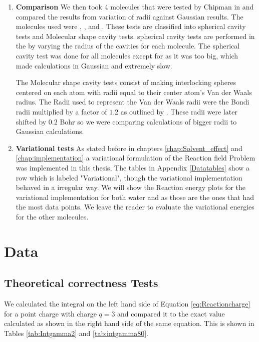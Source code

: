 \documentclass[../master_thesis.tex]{subfiles}
\begin{document}
\begin{enumerate}
\item \textbf{Comparison} We then took 4 molecules that were tested by Chipman in \cite{Chipman2002} and compared the
results from variation of radii against Gaussian results. The molecules used
were , ,  and . These tests are classified into
spherical cavity tests and Molecular shape cavity tests. spherical cavity tests are performed in the
by varying the radius of the cavities for each molecule. The spherical cavity test was done for
all molecules except for  as it was too big, which made calculations
in Gaussian and \mrchem extremely slow.

The Molecular shape cavity tests consist of making interlocking spheres centered on
each atom with radii equal to their center atom's Van der Waals radius. The Radii
used to represent the Van der Waals radii were the Bondi radii multiplied by a factor of
$1.2$ as outlined by \cite{Tomasi:1994wt}. These radii were later shifted by $0.2$ Bohr
so we were comparing \mrchem calculations of bigger radii to Gaussian calculations.

\item \textbf{Variational tests} As stated before in chapters \ref{chap:Solvent_effect} and \ref{chap:implementation}
a variational formulation of the Reaction field Problem was implemented in this thesis,
The tables in Appendix \ref{Datatables} show a row which is labeled "Variational",
though the variational implementation behaved in a irregular way. We will show
the Reaction energy plots for the variational implementation for both water
and  as those are the ones that had the most data points. We leave the
reader to evaluate the variational energies for the other molecules.

\end{enumerate}

\section{Data}
\subsection{Theoretical correctness Tests}
We calculated the integral on the left hand side of Equation \ref{eq:Reactioncharge} for a point charge
with charge $q=3$ and compared it to the exact value calculated as shown in the right hand side of the same
equation. This is shown in Tables \ref{tab:Intgamma2} and \ref{tab:intgamma80}.
\end{document}
